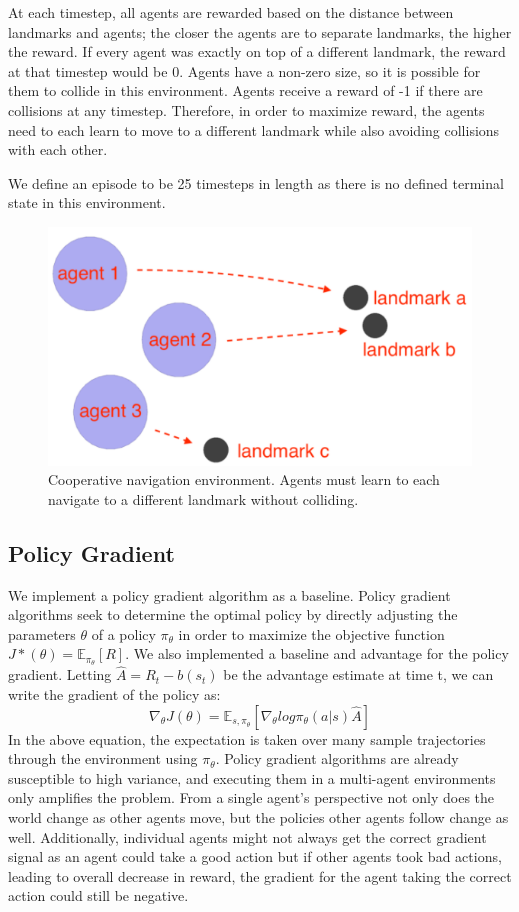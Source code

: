 \documentclass{article}
\begin{document}
At each timestep, all agents are rewarded based on the distance between landmarks and agents; the closer the agents are to separate landmarks, the higher the reward. If every agent was exactly on top of a different landmark, the reward at that timestep would be 0. Agents have a non-zero size, so it is possible for them to collide in this environment. Agents receive a reward of -1 if there are collisions at any timestep. Therefore, in order to maximize reward, the agents need to each learn to move to a different landmark while also avoiding collisions with each other.

We define an episode to be 25 timesteps in length as there is no defined terminal state in this environment.

\begin{figure}
\begin{center}
\includegraphics[scale=0.5]{env-image}
\end{center}
\caption{Cooperative navigation environment. Agents must learn to each navigate to a different landmark without colliding.}
\end{figure}

\subsection{Policy Gradient}
We implement a policy gradient algorithm as a baseline. Policy gradient algorithms seek to determine the optimal policy by directly adjusting the parameters $\theta$ of a policy $\pi_\theta$ in order to maximize the objective function $J*(\theta) = \mathbb{E}_{\pi_\theta}[R]$. We also implemented a baseline and advantage for the policy gradient. Letting $\hat{A} = R_t - b(s_t)$ be the advantage estimate at time t, we can write the gradient of the policy as:
$$\nabla_\theta J(\theta) = \mathbb{E}_{s,\pi_\theta}[\nabla_\theta log \pi_\theta(a|s)\hat{A}]$$
In the above equation, the expectation is taken over many sample trajectories through the environment using $\pi_\theta$. Policy gradient algorithms are already susceptible to  high variance, and executing them in a multi-agent environments only amplifies the problem. From a single agent's perspective not only does the world change as other agents move, but the policies other agents follow change as well. Additionally, individual agents might not always get the correct gradient signal as an agent could take a good action but if other agents took bad actions, leading to overall decrease in reward, the gradient for the agent taking the correct action could still be negative.
\end{document}
